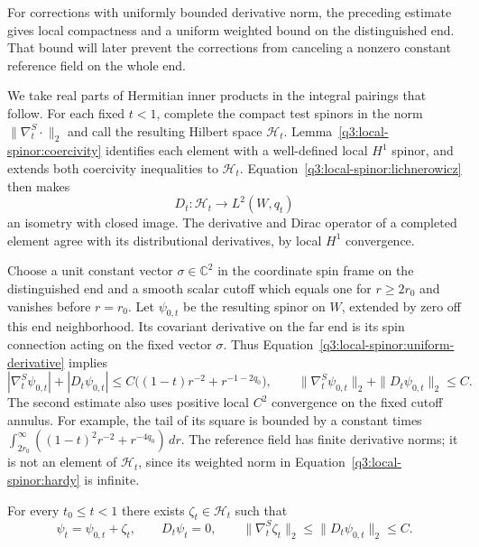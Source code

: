 For corrections with uniformly bounded derivative norm, the preceding
estimate gives local compactness and a uniform weighted bound on the
distinguished end. That bound will later prevent the corrections from
canceling a nonzero constant reference field on the whole end.

We take real parts of Hermitian inner products in the integral
pairings that follow.  For each fixed $t<1$, complete the compact
test spinors in the norm $\|\nabla^S_t\cdot\|_2$ and call the
resulting Hilbert space $\mathcal H_t$.
Lemma~\ref{q3:local-spinor:coercivity} identifies each element with a
well-defined local $H^1$ spinor, and extends both coercivity
inequalities to $\mathcal H_t$.  Equation~\eqref{q3:local-spinor:lichnerowicz}
then makes
\begin{equation}\label{q3:local-spinor:dirac-isometry}
 D_t:\mathcal H_t\longrightarrow L^2(W,q_t)
\end{equation}
an isometry with closed image.  The derivative and Dirac operator
of a completed element agree with its distributional derivatives,
by local $H^1$ convergence.

Choose a unit constant vector $\sigma\in\mathbb C^2$ in the coordinate
spin frame on the distinguished end and a smooth scalar cutoff
which equals one for $r\ge2r_0$ and vanishes before $r=r_0$.
Let $\psi_{0,t}$ be the resulting spinor on $W$, extended by zero
off this end neighborhood.  Its covariant derivative on the far
end is its spin connection acting on the fixed vector $\sigma$.
Thus Equation~\eqref{q3:local-spinor:uniform-derivative} implies
\begin{equation}\label{q3:local-spinor:reference-bounds}
 |\nabla^S_t\psi_{0,t}|+|D_t\psi_{0,t}|
       \le C\bigl((1-t)r^{-2}+r^{-1-2q_0}\bigr),
 \qquad
 \|\nabla^S_t\psi_{0,t}\|_2+\|D_t\psi_{0,t}\|_2\le C.
\end{equation}
The second estimate also uses positive local $C^2$ convergence
on the fixed cutoff annulus.  For example, the tail of its square
is bounded by a constant times
$\int_{2r_0}^{\infty}((1-t)^2r^{-2}+r^{-4q_0})\,dr$.
The reference field has finite derivative norms; it is not an
element of $\mathcal H_t$, since its weighted norm in
Equation~\eqref{q3:local-spinor:hardy} is infinite.

\begin{lemma}
\label{q3:local-spinor:harmonic-spinor}
For every $t_0\le t<1$ there exists $\zeta_t\in\mathcal H_t$ such
that
\begin{equation}\label{q3:local-spinor:projection-bound}
 \psi_t=\psi_{0,t}+\zeta_t,\qquad D_t\psi_t=0,
 \qquad
 \|\nabla^S_t\zeta_t\|_2\le\|D_t\psi_{0,t}\|_2\le C.
\end{equation}
\end{lemma}

